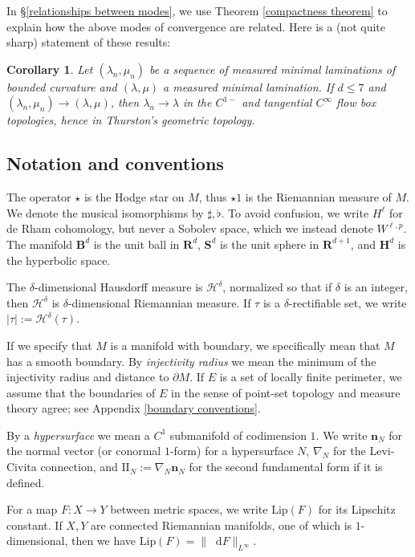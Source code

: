 \documentclass[reqno,11pt]{amsart}
\newcommand{\RR}{\mathbf{R}}
\newcommand{\Hyp}{\mathbf H}
\newcommand{\Sph}{\mathbf S}
\newcommand{\Ball}{\mathbf{B}}
\newcommand*\dif{\mathop{}\!\mathrm{d}}
\newcommand{\Two}{\mathrm{I\!I}}
\newcommand{\normal}{\mathbf n}
\newcommand{\Lip}{\mathrm{Lip}}
\newcommand{\dfn}[1]{\emph{#1}\index{#1}}
\newtheorem{corollary}[theorem]{Corollary}
\theoremstyle{definition}
\numberwithin{equation}{section}
\begin{document}
In \S\ref{relationships between modes}, we use Theorem \ref{compactness theorem} to explain how the above modes of convergence are related.
Here is a (not quite sharp) statement of these results:

\begin{corollary}
Let $(\lambda_n, \mu_n)$ be a sequence of measured minimal laminations of bounded curvature and $(\lambda, \mu)$ a measured minimal lamination.
If $d \leq 7$ and $(\lambda_n, \mu_n) \to (\lambda, \mu)$, then $\lambda_n \to \lambda$ in the $C^{1-}$ and tangential $C^\infty$ flow box topologies, hence in Thurston's geometric topology.
\end{corollary}


\subsection{Notation and conventions}
The operator $\star$ is the Hodge star on $M$, thus $\star 1$ is the Riemannian measure of $M$.
We denote the musical isomorphisms by $\sharp, \flat$.
To avoid confusion, we write $H^\ell$ for de Rham cohomology, but never a Sobolev space, which we instead denote $W^{\ell, p}$.
The manifold $\Ball^d$ is the unit ball in $\RR^d$, $\Sph^d$ is the unit sphere in $\RR^{d + 1}$, and $\Hyp^d$ is the hyperbolic space.

The $\delta$-dimensional Hausdorff measure is $\mathcal H^\delta$, normalized so that if $\delta$ is an integer, then $\mathcal H^\delta$ is $\delta$-dimensional Riemannian measure.
If $\tau$ is a $\delta$-rectifiable set, we write $|\tau| := \mathcal H^\delta(\tau)$.

If we specify that $M$ is a manifold with boundary, we specifically mean that $M$ has a smooth boundary.
By \dfn{injectivity radius} we mean the minimum of the injectivity radius and distance to $\partial M$.
If $E$ is a set of locally finite perimeter, we assume that the boundaries of $E$ in the sense of point-set topology and measure theory agree; see Appendix \ref{boundary conventions}.

By a \dfn{hypersurface} we mean a $C^1$ submanifold of codimension $1$.
We write $\normal_N$ for the normal vector (or conormal $1$-form) for a hypersurface $N$, $\nabla_N$ for the Levi-Civita connection, and $\Two_N := \nabla_N \normal_N$ for the second fundamental form if it is defined.

For a map $F: X \to Y$ between metric spaces, we write $\Lip(F)$ for its Lipschitz constant.
If $X, Y$ are connected Riemannian manifolds, one of which is $1$-dimensional, then we have $\Lip(F) = \|\dif F\|_{L^\infty}$.
\end{document}
